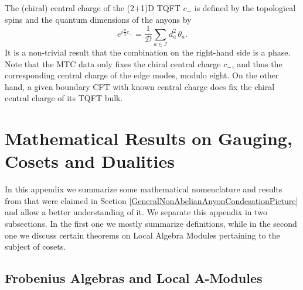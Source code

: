 \documentclass[11pt]{article}
\numberwithin{equation}{section}
\begin{document}
The (chiral) central charge of the (2+1)D TQFT $c_{-}$ is defined by the topological spins and the quantum dimensions of the anyons by
\begin{equation} \label{ChiralCentralChargeMTCFormula}
    e^{i \frac{\pi}{4}c_{-}} = \frac{1}{\mathcal{D}} \sum_{a \in \mathcal{I}} d_{a}^{2} \, \theta_{a}.
\end{equation}
It is a non-trivial result that the combination on the right-hand side is a phase. Note that the MTC data only fixes the chiral central charge $c_{-}$, and thus the corresponding central charge of the edge modes, modulo eight. On the other hand, a given boundary CFT with known central charge does fix the chiral central charge of its TQFT bulk. 





\section{Mathematical Results on Gauging, Cosets and Dualities} \label{MathematicsSection}

In this appendix we summarize some mathematical nomenclature and results from \cite{Frohlich:2003hm} that were claimed in Section \ref{GeneralNonAbelianAnyonCondesationPicture} and allow a better understanding of it. We separate this appendix in two subsections. In the first one we mostly summarize definitions, while in the second one we discuss certain theorems on Local Algebra Modules pertaining to the subject of cosets.





\subsection{Frobenius Algebras and Local A-Modules} \label{FrobeniusAlgebras}
\end{document}
